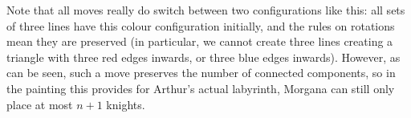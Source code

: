 Note that all moves really do switch between two configurations like this: all sets of three lines have this colour configuration initially, and the rules on rotations mean they are preserved (in particular, we cannot create three lines creating a triangle with three red edges inwards, or three blue edges inwards). However, as can be seen, such a move preserves the number of connected components, so in the painting this provides for Arthur’s actual labyrinth, Morgana can still only place at most \( n + 1 \) knights.